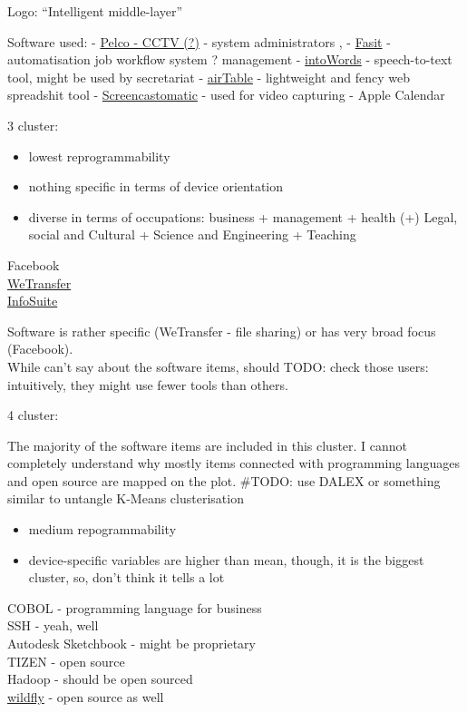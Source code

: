 \documentclass[]{article}
\providecommand{\tightlist}{%
  \setlength{\itemsep}{0pt}\setlength{\parskip}{0pt}}
\begin{document}
Logo: ``Intelligent middle-layer''

Software used: -
\href{https://www.sourcesecurity.com/cctv-software/make.mk-134-ga.html}{Pelco
- CCTV (?)} - system administrators , -
\href{https://schultz.dk/loesninger/schultz-fasit/}{Fasit} -
automatisation job workflow system ? management -
\href{https://www.mv-nordic.com/en/products/intowords/}{intoWords} -
speech-to-text tool, might be used by secretariat -
\href{https://airtable.com/}{airTable} - lightweight and fency web
spreadshit tool -
\href{https://screencast-o-matic.com/}{Screencastomatic} - used for
video capturing - Apple Calendar

3 cluster:

\begin{itemize}
\tightlist
\item
  lowest reprogrammability
\item
  nothing specific in terms of device orientation
\item
  diverse in terms of occupations: business + management + health (+)
  Legal, social and Cultural + Science and Engineering + Teaching
\end{itemize}

Facebook\\
\href{https://wetransfer.com/}{WeTransfer}\\
\href{https://www.infosuite.dk/}{InfoSuite}

Software is rather specific (WeTransfer - file sharing) or has very
broad focus (Facebook).\\
While can't say about the software items, should TODO: check those
users: intuitively, they might use fewer tools than others.

4 cluster:

The majority of the software items are included in this cluster. I
cannot completely understand why mostly items connected with programming
languages and open source are mapped on the plot. \#TODO: use DALEX or
something similar to untangle K-Means clusterisation

\begin{itemize}
\tightlist
\item
  medium repogrammability
\item
  device-specific variables are higher than mean, though, it is the
  biggest cluster, so, don't think it tells a lot
\end{itemize}

COBOL - programming language for business\\
SSH - yeah, well\\
Autodesk Sketchbook - might be proprietary\\
TIZEN - open source\\
Hadoop - should be open sourced\\
\href{Jboss/WildFly}{wildfly} - open source as well
\end{document}
